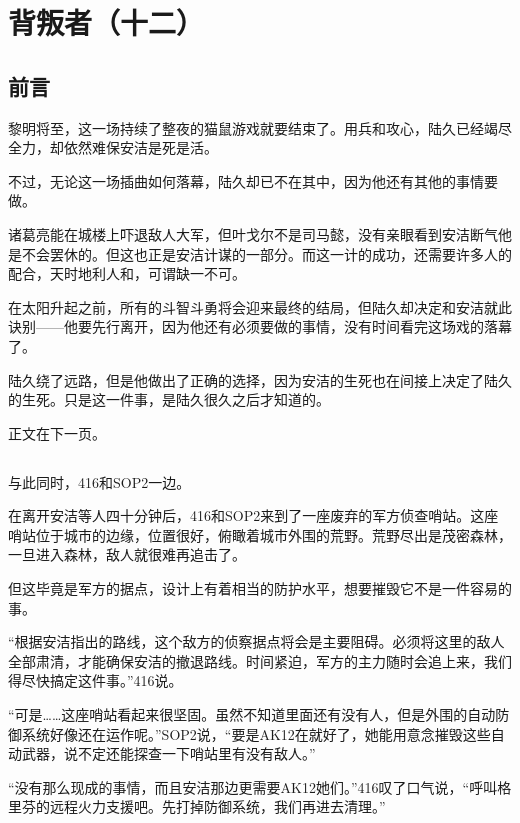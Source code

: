 \chapter{背叛者（十二）}

\section*{前言}


黎明将至，这一场持续了整夜的猫鼠游戏就要结束了。用兵和攻心，陆久已经竭尽全力，却依然难保安洁是死是活。

不过，无论这一场插曲如何落幕，陆久却已不在其中，因为他还有其他的事情要做。

\lineseparator


诸葛亮能在城楼上吓退敌人大军，但叶戈尔不是司马懿，没有亲眼看到安洁断气他是不会罢休的。但这也正是安洁计谋的一部分。而这一计的成功，还需要许多人的配合，天时地利人和，可谓缺一不可。

在太阳升起之前，所有的斗智斗勇将会迎来最终的结局，但陆久却决定和安洁就此诀别——他要先行离开，因为他还有必须要做的事情，没有时间看完这场戏的落幕了。

陆久绕了远路，但是他做出了正确的选择，因为安洁的生死也在间接上决定了陆久的生死。只是这一件事，是陆久很久之后才知道的。

正文在下一页。

\section*{}



与此同时，416和SOP2一边。

在离开安洁等人四十分钟后，416和SOP2来到了一座废弃的军方侦查哨站。这座哨站位于城市的边缘，位置很好，俯瞰着城市外围的荒野。荒野尽出是茂密森林，一旦进入森林，敌人就很难再追击了。

但这毕竟是军方的据点，设计上有着相当的防护水平，想要摧毁它不是一件容易的事。

“根据安洁指出的路线，这个敌方的侦察据点将会是主要阻碍。必须将这里的敌人全部肃清，才能确保安洁的撤退路线。时间紧迫，军方的主力随时会追上来，我们得尽快搞定这件事。”416说。

“可是……这座哨站看起来很坚固。虽然不知道里面还有没有人，但是外围的自动防御系统好像还在运作呢。”SOP2说，“要是AK12在就好了，她能用意念摧毁这些自动武器，说不定还能探查一下哨站里有没有敌人。”

“没有那么现成的事情，而且安洁那边更需要AK12她们。”416叹了口气说，“呼叫格里芬的远程火力支援吧。先打掉防御系统，我们再进去清理。”

